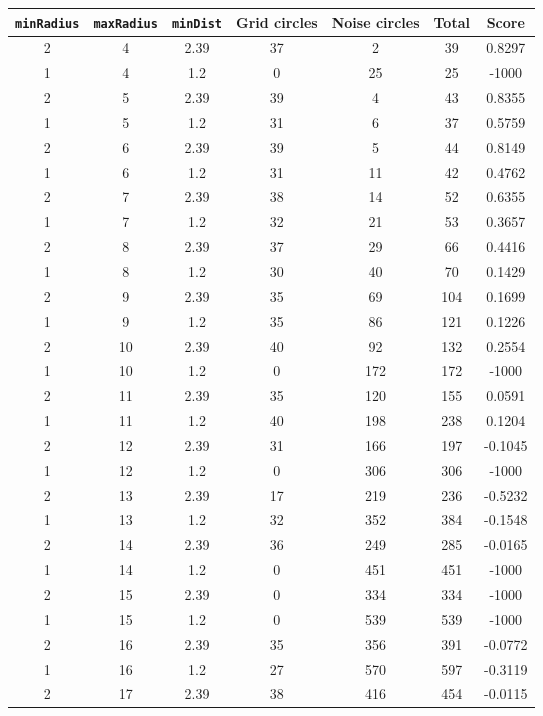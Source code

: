 \documentclass[letterpaper, 12pt]{article}
\begin{document}
\begin{longtable}{|c|c|c|c|c|c|c|}
\hline
\textbf{\texttt{minRadius}} & \textbf{\texttt{maxRadius}} & \textbf{\texttt{minDist}} & \textbf{Grid circles} & \textbf{Noise circles} & \textbf{Total} & \textbf{Score} \\
\hline
2 & 4 & 2.39 & 37 & 2 & 39 & 0.8297 \\
\hline
1 & 4 & 1.2 & 0 & 25 & 25 & -1000 \\
\hline
2 & 5 & 2.39 & 39 & 4 & 43 & 0.8355 \\
\hline
1 & 5 & 1.2 & 31 & 6 & 37 & 0.5759 \\
\hline
2 & 6 & 2.39 & 39 & 5 & 44 & 0.8149 \\
\hline
1 & 6 & 1.2 & 31 & 11 & 42 & 0.4762 \\
\hline
2 & 7 & 2.39 & 38 & 14 & 52 & 0.6355 \\
\hline
1 & 7 & 1.2 & 32 & 21 & 53 & 0.3657 \\
\hline
2 & 8 & 2.39 & 37 & 29 & 66 & 0.4416 \\
\hline
1 & 8 & 1.2 & 30 & 40 & 70 & 0.1429 \\
\hline
2 & 9 & 2.39 & 35 & 69 & 104 & 0.1699 \\
\hline
1 & 9 & 1.2 & 35 & 86 & 121 & 0.1226 \\
\hline
2 & 10 & 2.39 & 40 & 92 & 132 & 0.2554 \\
\hline
1 & 10 & 1.2 & 0 & 172 & 172 & -1000 \\
\hline
2 & 11 & 2.39 & 35 & 120 & 155 & 0.0591 \\
\hline
1 & 11 & 1.2 & 40 & 198 & 238 & 0.1204 \\
\hline
2 & 12 & 2.39 & 31 & 166 & 197 & -0.1045 \\
\hline
1 & 12 & 1.2 & 0 & 306 & 306 & -1000 \\
\hline
2 & 13 & 2.39 & 17 & 219 & 236 & -0.5232 \\
\hline
1 & 13 & 1.2 & 32 & 352 & 384 & -0.1548 \\
\hline
2 & 14 & 2.39 & 36 & 249 & 285 & -0.0165 \\
\hline
1 & 14 & 1.2 & 0 & 451 & 451 & -1000 \\
\hline
2 & 15 & 2.39 & 0 & 334 & 334 & -1000 \\
\hline
1 & 15 & 1.2 & 0 & 539 & 539 & -1000 \\
\hline
2 & 16 & 2.39 & 35 & 356 & 391 & -0.0772 \\
\hline
1 & 16 & 1.2 & 27 & 570 & 597 & -0.3119 \\
\hline
2 & 17 & 2.39 & 38 & 416 & 454 & -0.0115 \\

\end{longtable}
\end{document}
